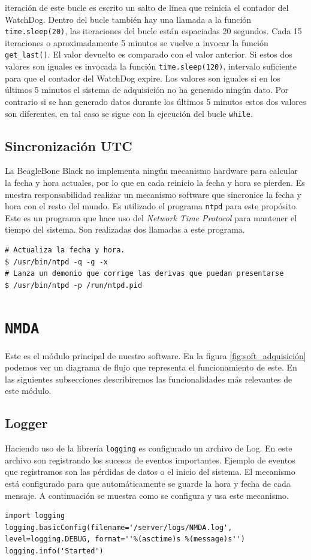 		iteración de este bucle es escrito un salto de línea que reinicia el contador del WatchDog. Dentro del bucle también hay una llamada a
		la función \texttt{time.sleep(20)}, las iteraciones del bucle están espaciadas 20 segundos. Cada 15 iteraciones o aproximadamente 5
		minutos se vuelve a invocar la función \texttt{get\_last()}. El valor devuelto es comparado con el valor anterior. Si estos dos
		valores son iguales es invocada la función \texttt{time.sleep(120)}, intervalo suficiente para que el contador del WatchDog expire.
		Los valores son iguales si en los últimos 5 minutos el sistema de adquisición no ha generado ningún dato. Por contrario si se han
		generado datos durante los últimos 5 minutos estos dos valores son diferentes, en tal caso se sigue con la ejecución del bucle
		\texttt{while}. 
	\subsection{Sincronización UTC}
		La BeagleBone Black no implementa ningún mecanismo hardware para calcular la fecha y hora actuales, por lo que en cada reinicio la
		fecha y hora se pierden. Es nuestra responsabilidad realizar un mecanismo software que sincronice la fecha y hora con el resto del
		mundo\cite{ntpd}. Es utilizado el programa \texttt{ntpd} para este propósito. Este es un programa que hace uso del \emph{Network Time
		Protocol}\cite{ntpWiki} para mantener el tiempo del sistema. Son realizadas dos llamadas a este programa.
		\begin{lstlisting}[style=myBash]
# Actualiza la fecha y hora.
$ /usr/bin/ntpd -q -g -x
# Lanza un demonio que corrige las derivas que puedan presentarse
$ /usr/bin/ntpd -p /run/ntpd.pid
		\end{lstlisting}

\section{\texttt{NMDA}}
	Este es el módulo principal de nuestro software. En la figura \ref{fig:soft_adquisición} podemos ver un diagrama de flujo que representa el
	funcionamiento de este. En las siguientes subsecciones describiremos las funcionalidades más relevantes de este módulo.
	\subsection{Logger}
		Haciendo uso de la librería \texttt{logging}\cite{py_logging} es configurado un archivo de Log. En este archivo son registrando los
		sucesos de eventos importantes. Ejemplo de eventos que registramos son las pérdidas de datos o el inicio del sistema. El mecanismo
		está configurado para que automáticamente se guarde la hora y fecha de cada mensaje. A continuación se muestra como se configura y usa
		este mecanismo.
		\begin{lstlisting}[style=myPython]
import logging
logging.basicConfig(filename='/server/logs/NMDA.log', level=logging.DEBUG, format=''%(asctime)s %(message)s'')
logging.info('Started')
		\end{lstlisting}
